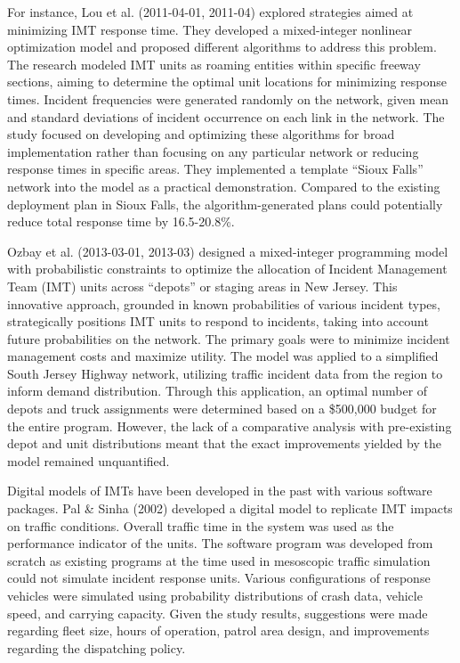 \documentclass[fancy, oneside, mastersfancy, ms]{byuthesis}
\begin{document}
For instance, Lou et al. (2011-04-01, 2011-04) explored strategies aimed
at minimizing IMT response time. They developed a mixed-integer
nonlinear optimization model and proposed different algorithms to
address this problem. The research modeled IMT units as roaming entities
within specific freeway sections, aiming to determine the optimal unit
locations for minimizing response times. Incident frequencies were
generated randomly on the network, given mean and standard deviations of
incident occurrence on each link in the network. The study focused on
developing and optimizing these algorithms for broad implementation
rather than focusing on any particular network or reducing response
times in specific areas. They implemented a template ``Sioux Falls''
network into the model as a practical demonstration. Compared to the
existing deployment plan in Sioux Falls, the algorithm-generated plans
could potentially reduce total response time by 16.5-20.8\%.

Ozbay et al. (2013-03-01, 2013-03) designed a mixed-integer programming
model with probabilistic constraints to optimize the allocation of
Incident Management Team (IMT) units across ``depots'' or staging areas
in New Jersey. This innovative approach, grounded in known probabilities
of various incident types, strategically positions IMT units to respond
to incidents, taking into account future probabilities on the network.
The primary goals were to minimize incident management costs and
maximize utility. The model was applied to a simplified South Jersey
Highway network, utilizing traffic incident data from the region to
inform demand distribution. Through this application, an optimal number
of depots and truck assignments were determined based on a \$500,000
budget for the entire program. However, the lack of a comparative
analysis with pre-existing depot and unit distributions meant that the
exact improvements yielded by the model remained unquantified.

Digital models of IMTs have been developed in the past with various
software packages. Pal \& Sinha (2002) developed a digital model to
replicate IMT impacts on traffic conditions. Overall traffic time in the
system was used as the performance indicator of the units. The software
program was developed from scratch as existing programs at the time used
in mesoscopic traffic simulation could not simulate incident response
units. Various configurations of response vehicles were simulated using
probability distributions of crash data, vehicle speed, and carrying
capacity. Given the study results, suggestions were made regarding fleet
size, hours of operation, patrol area design, and improvements regarding
the dispatching policy.
\end{document}
